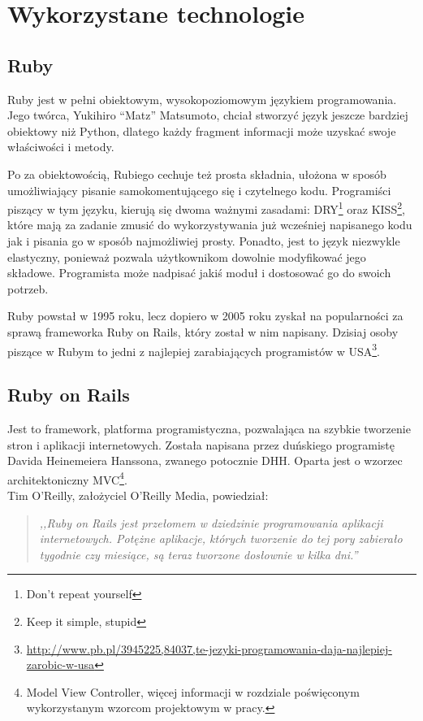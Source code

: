 \section{Wykorzystane technologie}
  \subsection{Ruby}
  Ruby jest w pełni obiektowym, wysokopoziomowym językiem programowania. Jego twórca, Yukihiro “Matz” Matsumoto, chciał stworzyć język jeszcze bardziej obiektowy niż Python, dlatego każdy fragment informacji może uzyskać swoje właściwości i metody.

  Po za obiektowością, Rubiego cechuje też prosta składnia, ułożona w sposób umożliwiający pisanie samokomentującego się i czytelnego kodu. Programiści piszący w tym języku, kierują się dwoma ważnymi zasadami: DRY\footnote{Don't repeat yourself} oraz KISS\footnote{Keep it simple, stupid}, które mają za zadanie zmusić do wykorzystywania już wcześniej napisanego kodu jak i pisania go w sposób najmożliwiej prosty. Ponadto, jest to język niezwykle elastyczny, ponieważ pozwala użytkownikom dowolnie modyfikować jego składowe. Programista może nadpisać jakiś moduł i dostosować go do swoich potrzeb.

  Ruby powstał w 1995 roku, lecz dopiero w 2005 roku zyskał na popularności za sprawą frameworka Ruby on Rails, który został w nim napisany. Dzisiaj osoby piszące w Rubym to jedni z najlepiej zarabiających programistów w USA\footnote{\url{http://www.pb.pl/3945225,84037,te-jezyki-programowania-daja-najlepiej-zarobic-w-usa}}.

  \subsection{Ruby on Rails}
  Jest to framework, platforma programistyczna, pozwalająca na szybkie tworzenie stron i aplikacji internetowych. Została napisana przez duńskiego programistę Davida Heinemeiera Hanssona, zwanego potocznie DHH. Oparta jest o wzorzec architektoniczny MVC\footnote{Model View Controller, więcej informacji w rozdziale poświęconym wykorzystanym wzorcom projektowym w pracy.}. \\
  Tim O'Reilly, założyciel O'Reilly Media, powiedział:
  \begin{quote}
    \emph{,,Ruby on Rails jest przełomem w dziedzinie programowania aplikacji internetowych.
    Potężne aplikacje, których tworzenie do tej pory zabierało tygodnie czy miesiące, są teraz tworzone dosłownie w kilka dni.”}
  \end{quote}

